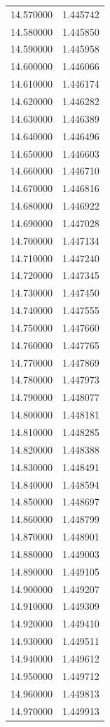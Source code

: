 \begin{tabular}{rr}
14.570000 & 1.445742 \\
14.580000 & 1.445850 \\
14.590000 & 1.445958 \\
14.600000 & 1.446066 \\
14.610000 & 1.446174 \\
14.620000 & 1.446282 \\
14.630000 & 1.446389 \\
14.640000 & 1.446496 \\
14.650000 & 1.446603 \\
14.660000 & 1.446710 \\
14.670000 & 1.446816 \\
14.680000 & 1.446922 \\
14.690000 & 1.447028 \\
14.700000 & 1.447134 \\
14.710000 & 1.447240 \\
14.720000 & 1.447345 \\
14.730000 & 1.447450 \\
14.740000 & 1.447555 \\
14.750000 & 1.447660 \\
14.760000 & 1.447765 \\
14.770000 & 1.447869 \\
14.780000 & 1.447973 \\
14.790000 & 1.448077 \\
14.800000 & 1.448181 \\
14.810000 & 1.448285 \\
14.820000 & 1.448388 \\
14.830000 & 1.448491 \\
14.840000 & 1.448594 \\
14.850000 & 1.448697 \\
14.860000 & 1.448799 \\
14.870000 & 1.448901 \\
14.880000 & 1.449003 \\
14.890000 & 1.449105 \\
14.900000 & 1.449207 \\
14.910000 & 1.449309 \\
14.920000 & 1.449410 \\
14.930000 & 1.449511 \\
14.940000 & 1.449612 \\
14.950000 & 1.449712 \\
14.960000 & 1.449813 \\
14.970000 & 1.449913 \\

\end{tabular}
